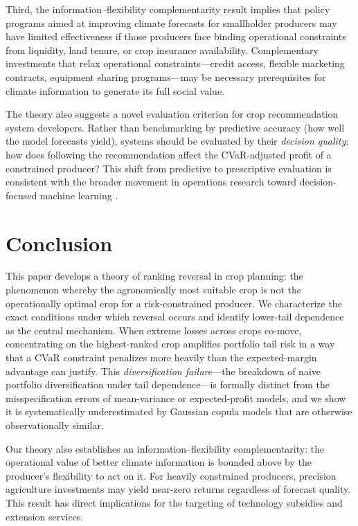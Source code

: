 \documentclass[12pt,review,authoryear]{elsarticle}
\numberwithin{equation}{section}
\begin{document}
Third, the information--flexibility complementarity result implies that
policy programs aimed at improving climate forecasts for smallholder
producers may have limited effectiveness if those producers face binding
operational constraints from liquidity, land tenure, or crop insurance
availability.  Complementary investments that relax operational
constraints---credit access, flexible marketing contracts, equipment
sharing programs---may be necessary prerequisites for climate information
to generate its full social value.

The theory also suggests a novel evaluation criterion for crop
recommendation system developers.  Rather than benchmarking by predictive
accuracy (how well the model forecasts yield), systems should be
evaluated by their \emph{decision quality}: how does following the
recommendation affect the CVaR-adjusted profit of a constrained producer?
This shift from predictive to prescriptive evaluation is consistent with
the broader movement in operations research toward decision-focused
machine learning \citep{Elmachtoub2022}.

\section{Conclusion}
\label{sec:conclusion}

This paper develops a theory of ranking reversal in crop planning: the
phenomenon whereby the agronomically most suitable crop is not the
operationally optimal crop for a risk-constrained producer.  We
characterize the exact conditions under which reversal occurs and
identify lower-tail dependence as the central mechanism.  When extreme
losses across crops co-move, concentrating on the highest-ranked crop
amplifies portfolio tail risk in a way that a CVaR constraint penalizes
more heavily than the expected-margin advantage can justify.  This
\emph{diversification failure}---the breakdown of naive portfolio
diversification under tail dependence---is formally distinct from the
misspecification errors of mean-variance or expected-profit models, and
we show it is systematically underestimated by Gaussian copula models
that are otherwise observationally similar.

Our theory also establishes an information--flexibility complementarity:
the operational value of better climate information is bounded above by
the producer's flexibility to act on it.  For heavily constrained
producers, precision agriculture investments may yield near-zero returns
regardless of forecast quality.  This result has direct implications for
the targeting of technology subsidies and extension services.
\end{document}
